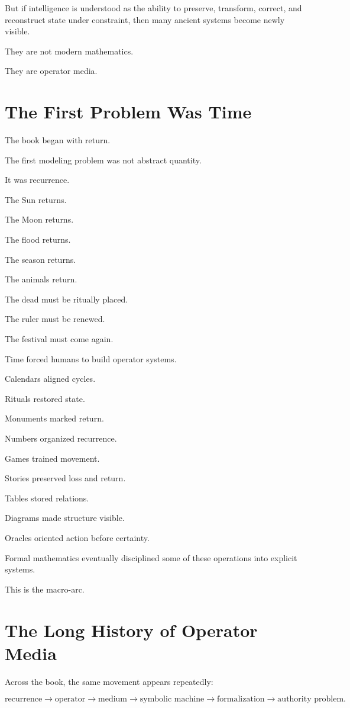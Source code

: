 \documentclass[11pt]{book}
\begin{document}
But if intelligence is understood as the ability to preserve, transform, correct, and reconstruct state under constraint, then many ancient systems become newly visible.

They are not modern mathematics.

They are operator media.

\section{The First Problem Was Time}

The book began with return.

The first modeling problem was not abstract quantity.

It was recurrence.

The Sun returns.

The Moon returns.

The flood returns.

The season returns.

The animals return.

The dead must be ritually placed.

The ruler must be renewed.

The festival must come again.

Time forced humans to build operator systems.

Calendars aligned cycles.

Rituals restored state.

Monuments marked return.

Numbers organized recurrence.

Games trained movement.

Stories preserved loss and return.

Tables stored relations.

Diagrams made structure visible.

Oracles oriented action before certainty.

Formal mathematics eventually disciplined some of these operations into explicit systems.

This is the macro-arc.

\section{The Long History of Operator Media}

Across the book, the same movement appears repeatedly:

\[
\text{recurrence}
\rightarrow
\text{operator}
\rightarrow
\text{medium}
\rightarrow
\text{symbolic machine}
\rightarrow
\text{formalization}
\rightarrow
\text{authority problem}.
\]
\end{document}

